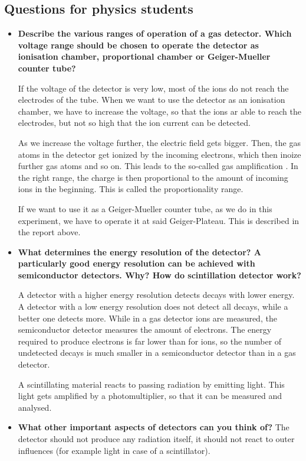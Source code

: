 \subsection{Questions for physics students}

\begin{itemize}
	\item \textbf{Describe the various ranges of operation of a gas
		detector. Which voltage range should be chosen
		to operate the detector as ionisation chamber,
		proportional chamber or Geiger-Mueller counter tube?}
	
	If the voltage of the detector is very low, most of the ions do not reach the electrodes of the tube.
	When we want to use the detector as an ionisation chamber, we have to increase the voltage, so that the ions ar able to reach the electrodes, but not so high that the ion current can be detected. 
	
	As we increase the voltage further, the electric field gets bigger.
	Then, the gas atoms in the detector get ionized by the incoming electrons, which then inoize further gas atoms and so on.
	This leads to the so-called gas amplification \cite{manual}.
	In the right range, the charge is then proportional to the amount of incoming ions in the beginning.
	This is called the proportionality range.
	
	If we want to use it as a Geiger-Mueller counter tube, as we do in this experiment, we have to operate it at said Geiger-Plateau.
	This is described in the report above. 
	
	\item \textbf{What determines the energy resolution of the
		detector? A particularly good energy resolution
		can be achieved with semiconductor detectors.
		Why? How do scintillation detector work?}
	
	A detector with a higher energy resolution detects decays with lower energy.
	A detector with a low energy resolution does not detect all decays, while a better one detects more.
	While in a gas detector ions are measured, the semiconductor detector measures the amount of electrons.
	The energy required to produce electrons is far lower than for ions, so the number of undetected decays is much smaller in a semiconductor detector than in a gas detector.
	
	A scintillating material reacts to passing radiation by emitting light.
	This light gets amplified by a photomultiplier, so that it can be measured and analysed.
	
	\item \textbf{What other important aspects of detectors can
		you think of?}
	The detector should not produce any radiation itself, it should not react to outer influences (for example light in case of a scintillator).
	

\end{itemize}
